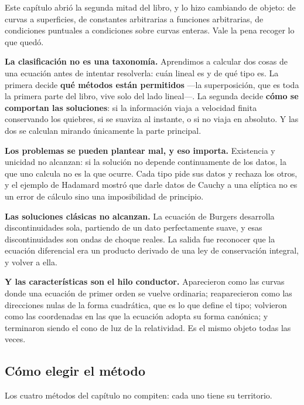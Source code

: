 \documentclass[
  spanish,
  a4paper,
]{scrbook}
\theoremstyle{definition}
\theoremstyle{plain}
\theoremstyle{definition}
\theoremstyle{plain}
\theoremstyle{definition}
\theoremstyle{remark}
\begin{document}
Este capítulo abrió la segunda mitad del libro, y lo hizo cambiando de
objeto: de curvas a superficies, de constantes arbitrarias a funciones
arbitrarias, de condiciones puntuales a condiciones sobre curvas
enteras. Vale la pena recoger lo que quedó.

\textbf{La clasificación no es una taxonomía.} Aprendimos a calcular dos
cosas de una ecuación antes de intentar resolverla: cuán lineal es y de
qué tipo es. La primera decide \textbf{qué métodos están permitidos}
---la superposición, que es toda la primera parte del libro, vive solo
del lado lineal---. La segunda decide \textbf{cómo se comportan las
soluciones}: si la información viaja a velocidad finita conservando los
quiebres, si se suaviza al instante, o si no viaja en absoluto. Y las
dos se calculan mirando únicamente la parte principal.

\textbf{Los problemas se pueden plantear mal, y eso importa.} Existencia
y unicidad no alcanzan: si la solución no depende continuamente de los
datos, la que uno calcula no es la que ocurre. Cada tipo pide sus datos
y rechaza los otros, y el ejemplo de Hadamard mostró que darle datos de
Cauchy a una elíptica no es un error de cálculo sino una imposibilidad
de principio.

\textbf{Las soluciones clásicas no alcanzan.} La ecuación de Burgers
desarrolla discontinuidades sola, partiendo de un dato perfectamente
suave, y esas discontinuidades son ondas de choque reales. La salida fue
reconocer que la ecuación diferencial era un producto derivado de una
ley de conservación integral, y volver a ella.

\textbf{Y las características son el hilo conductor.} Aparecieron como
las curvas donde una ecuación de primer orden se vuelve ordinaria;
reaparecieron como las direcciones nulas de la forma cuadrática, que es
lo que define el tipo; volvieron como las coordenadas en las que la
ecuación adopta su forma canónica; y terminaron siendo el cono de luz de
la relatividad. Es el mismo objeto todas las veces.

\subsection{Cómo elegir el método}\label{sec-elegir-metodo}

Los cuatro métodos del capítulo no compiten: cada uno tiene su
territorio.
\end{document}
